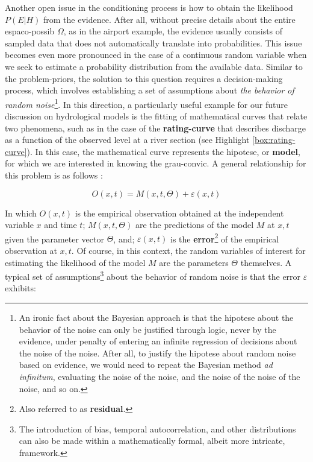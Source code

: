 \documentclass[./main_en.tex]{subfiles}
\begin{document}
\par Another open issue in the \gls{conditioning} process is how to obtain the \gls{likelihood} $P(E | H)$ from the evidence. After all, without precise details about the entire \gls{espaco-possib} $\Omega$, as in the airport example, the evidence usually consists of sampled data that does not automatically translate into probabilities. This issue becomes even more pronounced in the case of a continuous random variable when we seek to estimate a probability distribution from the available data. Similar to the \gls{problem-priors}, the solution to this question requires a decision-making process, which involves establishing a set of assumptions about \textit{the behavior of random noise}\footnote{An ironic fact about the Bayesian approach is that the \gls{hipotese} about the behavior of the noise can only be justified through logic, never by the evidence, under penalty of entering an infinite regression of decisions about the noise of the noise. After all, to justify the \gls{hipotese} about random noise based on evidence, we would need to repeat the Bayesian method \textit{ad infinitum}, evaluating the noise of the noise, and the noise of the noise of the noise, and so on.}. In this direction, a particularly useful example for our future discussion on hydrological models is the fitting of mathematical curves that relate two phenomena, such as in the case of the \textbf{\gls{rating-curve}} that describes discharge as a function of the observed level at a river section (see Highlight \ref{box:rating-curve}). In this case, the mathematical curve represents the \gls{hipotese}, or \textbf{\gls{model}}, for which we are interested in knowing the \gls{grau-convic}. A general relationship for this problem is as follows \cite{Box1979}:
\begin{linenomath*}
\begin{equation}
\label{eq:bayes-model}
    O(x, t) = M(x, t, \Theta) + \varepsilon(x, t)
\end{equation}
\end{linenomath*}
In which $O(x, t)$ is the empirical observation obtained at the independent variable $x$ and time $t$; $M(x, t, \Theta)$ are the predictions of the \gls{model} $M$ at $x,t$ given the parameter vector $\Theta$, and; $\varepsilon(x, t)$ is the \textbf{error}\footnote{Also referred to as \textbf{residual}.} of the empirical observation at $x,t$. Of course, in this context, the random variables of interest for estimating the \gls{likelihood} of the \gls{model} $M$ are the \gls{parameters} $\Theta$ themselves. A typical set of assumptions\footnote{The introduction of bias, temporal autocorrelation, and other distributions can also be made within a mathematically formal, albeit more intricate, framework.} about the behavior of random noise is that the error $\varepsilon$ exhibits:
\end{document}
